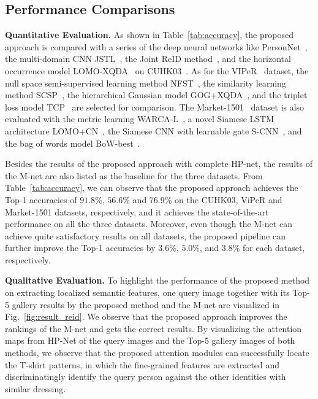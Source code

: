\documentclass[10pt,twocolumn,letterpaper]{article}
\begin{document}
\subsection{Performance Comparisons}

\noindent\textbf{Quantitative Evaluation.}
As shown in Table~\ref{tab:accuracy}, the proposed approach is compared with a series of the deep neural networks like PersonNet~\cite{wu2016personnet}, the multi-domain CNN JSTL~\cite{xiao2016learning},
the Joint ReID method~\cite{ahmed2015improved}, and the horizontal occurrence model LOMO-XQDA~\cite{liao2015person} on CUHK03~\cite{li2014deepreid}.
As for the VIPeR~\cite{gray2007evaluating} dataset, the null space semi-supervised learning method NFST~\cite{zhang2016learning}, the similarity learning method SCSP~\cite{chen2016similarity}, the hierarchical Gaussian model GOG+XQDA~\cite{matsukawa2016hierarchical},
and the triplet loss model TCP~\cite{cheng2016person} are selected for comparison.
The Market-1501~\cite{zheng2015scalable} dataset is also evaluated with the metric learning WARCA-L~\cite{jose2016scalable}, a novel Siamese LSTM architecture LOMO+CN~\cite{varior2016siamese}, the Siamese CNN with learnable gate S-CNN~\cite{varior2016gated},
and the bag of words model BoW-best~\cite{zheng2015scalable}.

Besides the results of the proposed approach with complete HP-net, the results of the M-net are also listed as the baseline for the three datasets.
From Table~\ref{tab:accuracy}, we can observe that the proposed approach achieves the Top-1 accuracies of $91.8\%$, $56.6\%$ and $76.9\%$ on the CUHK03, ViPeR and Market-1501 datasets, respectively, and it achieves the state-of-the-art performance on all the three datasets.
Moreover, even though the M-net can achieve quite satisfactory results on all datasets, the proposed pipeline can further improve the Top-1 accuracies by $3.6\%$, $5.0\%$, and $3.8\%$ for each dataset, respectively.

\vspace{+0.1cm}
\noindent\textbf{Qualitative Evaluation.}
To highlight the performance of the proposed method on extracting localized semantic features, one query image together with its Top-5 gallery results by the proposed method and the M-net are visualized in Fig.~\ref{fig:result_reid}.
We observe that the proposed approach improves the rankings of the M-net and gets the correct results.
By visualizing the attention maps from HP-Net of the query images and the Top-5 gallery images of both methods, we observe that the proposed attention modules can successfully locate the T-shirt patterns, in which the fine-grained features are extracted and discriminatingly identify the query person against the other identities with similar dressing.
\
\end{document}
